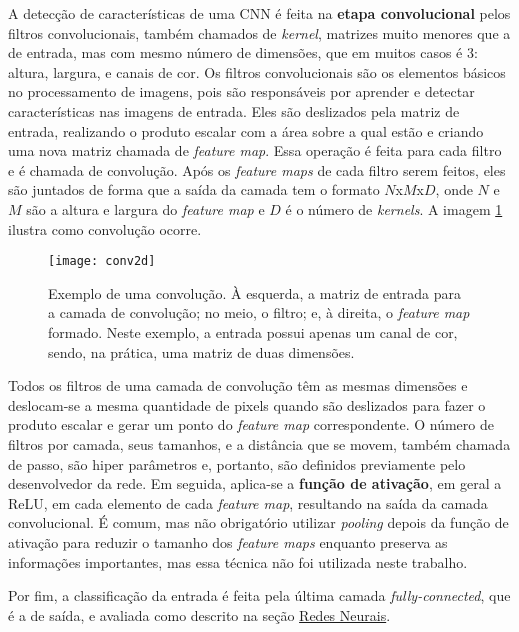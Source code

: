 A detecção de características de uma CNN é feita na \textbf{etapa convolucional} pelos filtros convolucionais, também chamados de \textit{kernel}, matrizes muito menores que a de entrada, mas com mesmo número de dimensões, que em muitos casos é 3: altura, largura, e canais de cor.
Os filtros convolucionais são os elementos básicos no processamento de imagens, pois são responsáveis por aprender e detectar características nas imagens de entrada.
Eles são deslizados pela matriz de entrada, realizando o produto escalar com a área sobre a qual estão e criando uma nova matriz chamada de \textit{feature map}.
Essa operação é feita para cada filtro e é chamada de convolução.
Após os \textit{feature maps} de cada filtro serem feitos, eles são juntados de forma que a saída da camada tem o formato $N$x$M$x$D$, onde $N$ e $M$ são a altura e largura do \textit{feature map} e $D$ é o número de \textit{kernels}.
A imagem \ref{fig:conv2d} ilustra como convolução ocorre.

\begin{figure}[h!]
\texttt{[image: conv2d]}
\centering
\caption{Exemplo de uma convolução. À esquerda, a matriz de entrada para a camada de convolução; no meio, o filtro; e, à direita, o \textit{feature map} formado. Neste exemplo, a entrada possui apenas um canal de cor, sendo, na prática, uma matriz de duas dimensões.}
\label{fig:conv2d}
\end{figure}

Todos os filtros de uma camada de convolução têm as mesmas dimensões e deslocam-se a mesma quantidade de pixels quando são deslizados para fazer o produto escalar e gerar um ponto do \textit{feature map} correspondente.
O número de filtros por camada, seus tamanhos, e a distância que se movem, também chamada de passo, são hiper parâmetros e, portanto, são definidos previamente pelo desenvolvedor da rede.
Em seguida, aplica-se a \textbf{função de ativação}, em geral a ReLU, em cada elemento de cada \textit{feature map}, resultando na saída da camada convolucional.
É comum, mas não obrigatório utilizar \textit{pooling} depois da função de ativação para reduzir o tamanho dos \textit{feature maps} enquanto preserva as informações importantes, mas essa técnica não foi utilizada neste trabalho.

Por fim, a classificação da entrada é feita pela última camada \textit{fully-connected}, que é a de saída, e avaliada como descrito na seção \hyperref[sec:nn]{Redes Neurais}.

